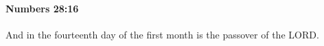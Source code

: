 
		\paragraph{Numbers 28:16} %
			\label{NUMBERS-28-16}

			And in the fourteenth day of the first month is the passover of the LORD.



